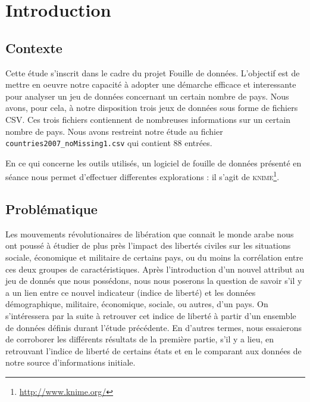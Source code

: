 \section{Introduction}

\subsection{Contexte}
Cette étude s'inscrit dans le cadre du projet Fouille de données. L'objectif est de mettre en oeuvre notre capacité à adopter une démarche efficace et interessante pour analyser un jeu de données concernant un certain nombre de pays.
Nous avons, pour cela, à notre disposition trois jeux de données sous forme de fichiers CSV. Ces trois fichiers contiennent de nombreuses informations sur un certain nombre de pays. Nous avons restreint notre étude au fichier \verb!countries2007_noMissing1.csv! qui contient 88 entrées.

En ce qui concerne les outils utilisés, un logiciel de fouille de données présenté en séance nous permet d'effectuer differentes explorations : il s'agit de \textsc{knime}\footnote{\url{http://www.knime.org/}}. 

\subsection{Problématique}

Les mouvements révolutionaires de libération que connait le monde arabe nous ont poussé à étudier de plus près l'impact des libertés civiles sur les situations sociale, économique et militaire de certains pays, ou du moins la corrélation entre ces deux groupes de caractéristiques.
Après l'introduction d'un nouvel attribut au jeu de donnés que nous possédons, nous nous poserons la question de savoir s'il y a un lien entre ce nouvel indicateur (indice de liberté) et les données démographique, militaire, économique, sociale, ou autres, d'un pays.
On s'intéressera par la suite à retrouver cet indice de liberté à partir d'un ensemble de données définis durant l'étude précédente. En d'autres termes, nous essaierons de corroborer les différents résultats de la première partie, s'il y a lieu, en retrouvant l'indice de liberté de certains états et en le comparant aux données de notre source d'informations initiale.



